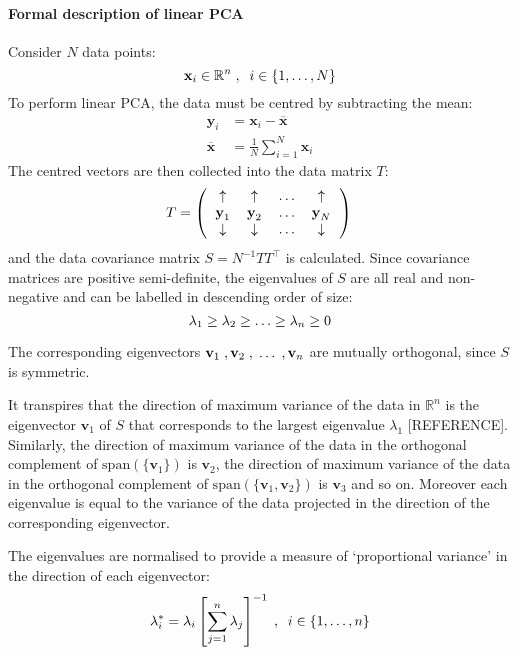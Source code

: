 \documentclass[preprint,authoryear,3p]{elsarticle}
\begin{document}
\paragraph*{Formal description of linear PCA}

Consider $N$ data points:
$$
\textbf{x}_i \in \mathbb{R}^n \; , \; \; i \in \{1, \mathellipsis , N \}
$$
To perform linear PCA, the data must be centred by subtracting the mean:
\begin{align*}
\textbf{y}_{i} &= \textbf{x}_{i} - \overline{\textbf{x}} \\
\overline{\textbf{x}} &= \frac{1}{N} \displaystyle \sum_{i =1}^N \textbf{x}_{i}
\end{align*}
The centred vectors are then collected into the data matrix $T$:
\begin{equation*}
T = \left(
\begin{tabular}{cccc}
$\uparrow$ & $\uparrow$ & $\mathellipsis$ & $\uparrow$\\
$\textbf{y}_{1}$ & $\textbf{y}_{2}$ & $\mathellipsis$ & $\textbf{y}_{N}$ \\
$\downarrow$ & $\downarrow$ & $\mathellipsis$ & $\downarrow$
\end{tabular} \right) \\
\end{equation*}
and the data covariance matrix $S = N^{-1} T {T}^\top$ is calculated. Since covariance matrices are positive semi-definite, the eigenvalues of $S$ are all real and non-negative and can be labelled in descending order of size:
$$\lambda_1 \geq \lambda_2 \geq \mathellipsis \geq \lambda_n \geq 0$$

The corresponding eigenvectors $\textbf{v}_1 \; , \textbf{v}_2 \; , \; \mathellipsis \; , \textbf{v}_n$ are mutually orthogonal, since $S$ is symmetric.

It transpires that the direction of maximum variance of the data in $\mathbb{R}^n$ is the eigenvector $\textbf{v}_1$ of $S$ that corresponds to the largest eigenvalue $\lambda_1$ [REFERENCE]. Similarly, the direction of maximum variance of the data in the orthogonal complement of $\text{span}(\{\textbf{v}_1\})$ is $\textbf{v}_2$, the direction of maximum variance of the data in the orthogonal complement of $\text{span}(\{\textbf{v}_1,\textbf{v}_2\})$ is $\textbf{v}_3$ and so on. Moreover each eigenvalue is equal to the variance of the data projected in the direction of the corresponding eigenvector.

The eigenvalues are normalised to provide a measure of `proportional variance' in the direction of each eigenvector:
\begin{align*}
\lambda_i^{*} = \lambda_i \left[ \displaystyle \sum_{j=1}^{n} \lambda_j \right]^{-1} \; , \; \; i \in \{1, \mathellipsis , n \}
\end{align*}
\end{document}
